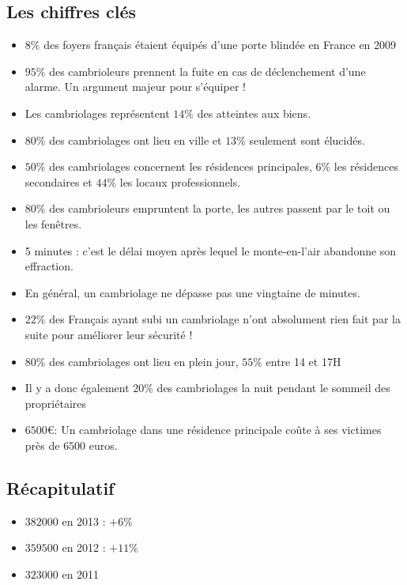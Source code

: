 \subsection*{Les chiffres clés}
\begin{itemize}
	\item $8\%$ des foyers français étaient équipés d'une porte blindée en France en 2009
	\item $95\%$ des cambrioleurs prennent la fuite en cas de déclenchement d’une alarme. Un argument majeur pour s'équiper !
	\item Les cambriolages représentent $14\%$ des atteintes aux biens.
	\item $80\%$ des cambriolages ont lieu en ville et $13\%$ seulement sont élucidés.
	\item $50\%$ des cambriolages concernent les résidences principales, $6\%$ les résidences secondaires et $44\%$ les locaux professionnels.
	\item $80\%$ des cambrioleurs empruntent la porte, les autres passent par le toit ou les fenêtres.
	\item 5 minutes : c'est le délai moyen après lequel le monte-en-l'air abandonne son effraction.
	\item En général, un cambriolage ne dépasse pas une vingtaine de minutes.
	\item $22\%$ des Français ayant subi un cambriolage n'ont absolument rien fait par la suite pour améliorer leur sécurité !
	\item $80\%$ des cambriolages ont lieu en plein jour, $55\%$ entre 14 et 17H
	\item Il y a donc également $20\%$ des cambriolages la nuit pendant le sommeil des propriétaires
	\item $6500$\euro : Un cambriolage dans une résidence principale coûte à ses victimes près de $6500$ euros.\\
\end{itemize}

\subsection*{Récapitulatif}
\begin{itemize}
	\item $382000$ en 2013 : $+6\%$
	\item $359500$ en 2012 : $+11\%$
	\item $323000$ en 2011\\
\end{itemize}


